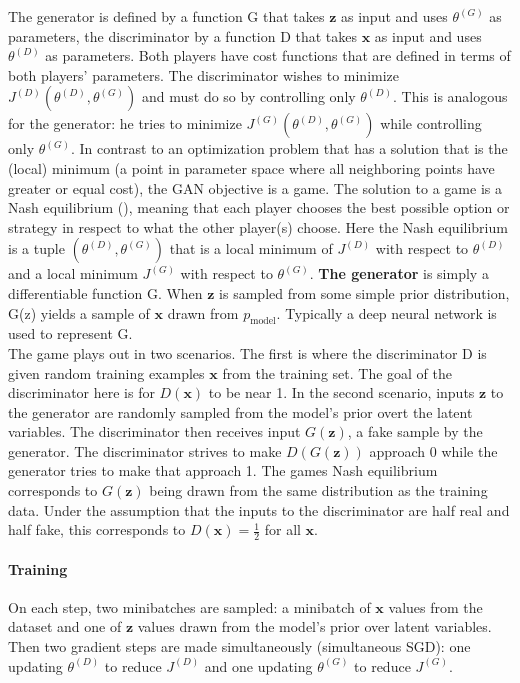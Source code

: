 The generator is defined by a function G that takes $\mathbf{z}$ as input and uses $\theta^{(G)}$ as parameters, the discriminator by a function D that takes $\mathbf{x}$ as input and uses $\theta^{(D)}$ as parameters. Both players have cost functions that are defined in terms of both players' parameters. The discriminator  wishes to minimize $J^{(D)}(\theta^{(D)}, \theta^{(G)})$ and must do so by controlling only $\theta^{(D)}$. This is analogous for the generator: he tries to minimize $J^{(G)}(\theta^{(D)}, \theta^{(G)})$ while controlling only $\theta^{(G)}$. In contrast to an optimization problem that has a solution that is the (local) minimum (a point in parameter space where all neighboring points have greater or equal cost), the GAN objective is a game. The solution to a game is a Nash equilibrium (), meaning that each player chooses the best possible option or strategy in respect to what the other player(s) choose. Here the Nash equilibrium is a tuple $(\theta^{(D)}, \theta^{(G)})$ that is a local minimum of $J^{(D)}$ with respect to $\theta^{(D)}$ and a local minimum $J^(G)$ with respect to $\theta^{(G)}$.
\textbf{The generator} is simply a differentiable function G. When $\mathbf{z}$ is sampled from some simple prior distribution, G(z) yields a sample of $\mathbf{x}$ drawn from $p_{\text{model}}$. Typically a deep neural network is used to represent G. \\
The game plays out in two scenarios. The first is where the discriminator D is given random training examples $\mathbf{x}$ from the training set. The goal of the discriminator here is for $D(\mathbf{x})$ to be near 1. In the second scenario, inputs $\mathbf{z}$ to the generator are randomly sampled from the model's prior overt the latent variables. The discriminator then receives input $G(\mathbf{z})$, a fake sample by the generator. The discriminator strives to make $D(G(\mathbf{z}))$ approach 0 while the generator tries to make that approach 1. The games Nash equilibrium corresponds to $G(\mathbf{z})$ being drawn from the same distribution as the training data. Under the assumption that the inputs to the discriminator are half real and half fake, this corresponds to $D(\mathbf{x}) = \frac{1}{2}$ for all $\mathbf{x}$.

\paragraph{Training}
On each step, two minibatches are sampled: a minibatch of $\mathbf{x}$ values from the dataset and one of $\mathbf{z}$ values drawn from the model's prior over latent variables. Then two gradient steps are made simultaneously (simultaneous SGD): one updating $\theta^{(D)}$ to reduce $J^{(D)}$ and one updating $\theta^{(G)}$ to reduce $J^{(G)}$.

